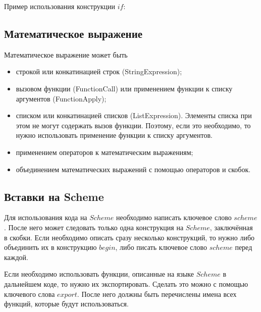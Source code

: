         

        Пример использования конструкции $if$:

        

    \subsection{Математическое выражение}
        Математическое выражение может быть
        \begin{itemize}
            \item строкой или конкатинацией строк (StringExpression);
            \item вызовом функции (FunctionCall) или применением функции к списку аргументов (FunctionApply);
            \item списком или конкатинацией списков (ListExpression).
                Элементы списка при этом не могут содержать вызов функции.
                Поэтому, если это необходимо, то нужно использовать применение функции к списку аргументов.
            \item применением операторов к математическим выражениям;
            \item объединением математических выражений с помощью операторов и скобок.
        \end{itemize}
        
        

    \subsection{Вставки на Scheme}
        Для использования кода на $Scheme$ необходимо написать ключевое слово $scheme$.
        После него может следовать только одна конструкция на $Scheme$, заключённая в скобки.
        Если необходимо описать сразу несколько конструкций, то нужно либо объединить их в конструкцию $begin$, либо писать ключевое слово $scheme$ перед каждой.
        
        

        Если необходимо использовать функции, описанные на языке $Scheme$ в дальнейшем коде, то нужно их экспортировать.
        Сделать это можно с помощью ключевого слова $export$.
        После него должны быть перечислены имена всех функций, которые будут использоваться.
        
        

